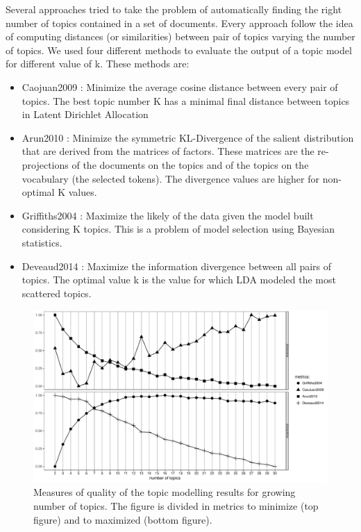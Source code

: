 \documentclass[]{book}
\providecommand{\tightlist}{%
  \setlength{\itemsep}{0pt}\setlength{\parskip}{0pt}}
\begin{document}
Several approaches tried to take the problem of automatically finding
the right number of topics contained in a set of documents. Every
approach follow the idea of computing distances (or similarities)
between pair of topics varying the number of topics. We used four
different methods to evaluate the output of a topic model for different
value of k. These methods are:

\begin{itemize}
\tightlist
\item
  Caojuan2009 \citep{cao2009density}: Minimize the average cosine
  distance between every pair of topics. The best topic number K has a
  minimal final distance between topics in Latent Dirichlet Allocation
\item
  Arun2010 \citep{arun2010finding}: Minimize the symmetric KL-Divergence
  of the salient distribution that are derived from the matrices of
  factors. These matrices are the re-projections of the documents on the
  topics and of the topics on the vocabulary (the selected tokens). The
  divergence values are higher for non-optimal K values.
\item
  Griffiths2004 \citep{griffiths2004finding}: Maximize the likely of the
  data given the model built considering K topics. This is a problem of
  model selection using Bayesian statistics.
\item
  Deveaud2014 \citep{deveaud2014accurate}: Maximize the information
  divergence between all pairs of topics. The optimal value k is the
  value for which LDA modeled the most scattered topics.
\end{itemize}

\begin{figure}

{\centering \includegraphics[width=0.6\linewidth]{_bookdown_files/figures/FindTopicsNumber_plot_bl} 

}

\caption{Measures of quality of the topic modelling results for growing number of topics. The figure is divided in metrics to minimize (top figure) and to maximized (bottom figure).}\label{fig:topicnumsmbl}
\end{figure}
\end{document}
